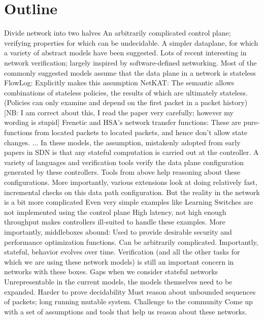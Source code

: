 \section{Outline}
\begin{outline}
\1 Divide network into two halves
    \2 An arbitrarily complicated control plane; verifying properties for which can be undecidable.
    \2 A simpler dataplane, for which a variety of abstract models have been suggested.
\1 Lots of recent interesting in network verification; largely inspired by software-defined networking.
\1 Most of the commonly suggested models assume that the data plane in a network is stateless
    \2 FlowLog: Explicitly makes this assumption
    \2 NetKAT: The semantic allows combinations of stateless policies, the results of which are ultimately stateless. (Policies can only examine and depend on the first packet in a packet history) [NB: I am correct about this, I read the paper very carefully; however my wording is stupid]
    \2 Frenetic and HSA's network transfer functions: These are pure-functions from located packets to located packets, and hence don't allow state changes.
...
\1 In these models, the assumption, mistakenly adopted from early papers in SDN is that any stateful computation is carried out at the controller.
    \2 A variety of languages and verification tools verify the data plane configuration generated by these controllers. Tools from above help reasoning about these configurations.
    \2 More importantly, various extensions look at doing relatively fast, incremental checks on this data path configuration.
\1 But the reality in the network is a bit more complicated
    \2 Even very simple examples like Learning Switches are not implemented using the control plane
    \2 High latency, not high enough throughput makes controllers ill-suited to handle these examples.
    \2 More importantly, middleboxes abound:
        \3 Used to provide desirable security and performance optimization functions.
        \3 Can be arbitrarily complicated.
        \3 Importantly, stateful, behavior evolves over time.
    \2 Verification (and all the other tasks for which we are using these network models) is still an important concern in networks with these boxes.
\1 Gaps when we consider stateful networks
    \2 Unrepresentable in the current models, the models themselves need to be expanded.
    \2 Harder to prove decidability
    \2 Must reason about unbounded sequences of packets; long running mutable system.
\1 Challenge to the community
    \2 Come up with a set of assumptions and tools that help us reason about these networks.

\end{outline}
